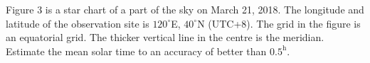Figure 3 is a star chart of a part of the sky on March 21, 2018. The longitude
and latitude of the observation site is $120^\circ$E, $40^\circ$N (UTC+8). The
grid in the figure is an equatorial grid. The thicker vertical line in the
centre is the meridian. Estimate the mean solar time to an accuracy of better
than $0.5^{\mathrm{h}}$.

